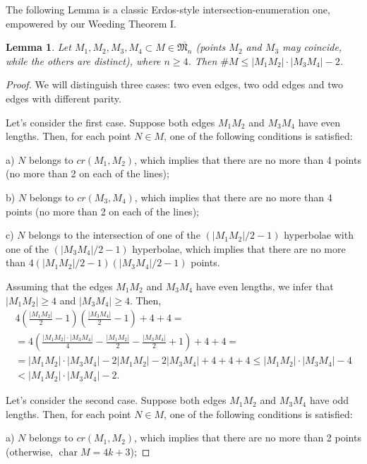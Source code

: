 \documentclass[a4paper,14pt]{article} %
\theoremstyle{plain}
\newtheorem{lemma}[theorem]{Lemma}
\theoremstyle{definition}
\begin{document}
The following Lemma is a classic Erdos-style intersection-enumeration one,
empowered by our Weeding Theorem I.

\begin{lemma}
	\label{lem:intersection_enumeration}
	Let ${M_1, M_2, M_3, M_4} \subset M \in \overline{\mathfrak{M}_n}$ (points $M_2$ and $M_3$ may coincide, while the others are distinct), where $n \ge 4$. Then $\# M \le |M_1 M_2| \cdot |M_3 M_4| - 2$.
\end{lemma}

\begin{proof}
	We will distinguish three cases: two even edges, two odd edges and two edges with different parity.


	Let's consider the first case. Suppose both edges $M_1M_2$ and $M_3M_4$ have even lengths. Then, for each point $N\in M$, one of the following conditions is satisfied:

	a) $N$ belongs to $cr(M_1,M_2)$, which implies that there are no more than 4 points (no more than 2 on each of the lines);

	b) $N$ belongs to $cr(M_3,M_4)$, which implies that there are no more than 4 points (no more than 2 on each of the lines);

	c) $N$ belongs to the intersection of one of the $(|M_1M_2|/2 - 1)$ hyperbolae with one of the $(|M_3M_4|/2 - 1)$ hyperbolae, which implies that there are no more than $4(|M_1M_2|/2 - 1)(|M_3M_4|/2 - 1)$ points.

	Assuming that the edges $M_1M_2$ and $M_3M_4$ have even lengths,
	we infer that $|M_1M_2|\geq4$ and $|M_3M_4|\geq4$.
	Then,
	\begin{multline}
		4 \left(\frac{|M_1 M_2|}{2} - 1\right) \left(\frac{|M_3 M_4|}{2} - 1 \right) + 4 + 4
		=
		\\=
		 4\left(\frac{|M_1 M_2| \cdot |M_3 M_4|}{4} - \frac{|M_1 M_2|}{2} - \frac{|M_3 M_4|}{2}+1\right) + 4 + 4
		=
		\\=
		|M_1 M_2| \cdot |M_3 M_4| - 2 |M_1 M_2| - 2 |M_3 M_4| + 4 + 4 + 4
		\leq
		|M_1 M_2| \cdot |M_3 M_4| - 4 \\
		<
		|M_1 M_2| \cdot |M_3 M_4| - 2
		.
	\end{multline}

	Let's consider the second case. Suppose both edges $M_1M_2$ and $M_3M_4$ have odd lengths. Then, for each point $N\in M$, one of the following conditions is satisfied:

	a) $N$ belongs to $cr(M_1,M_2)$, which implies that there are no more than 2 points (otherwise, $\operatorname{char} M = 4k+3$);


\end{proof}
\end{document}
